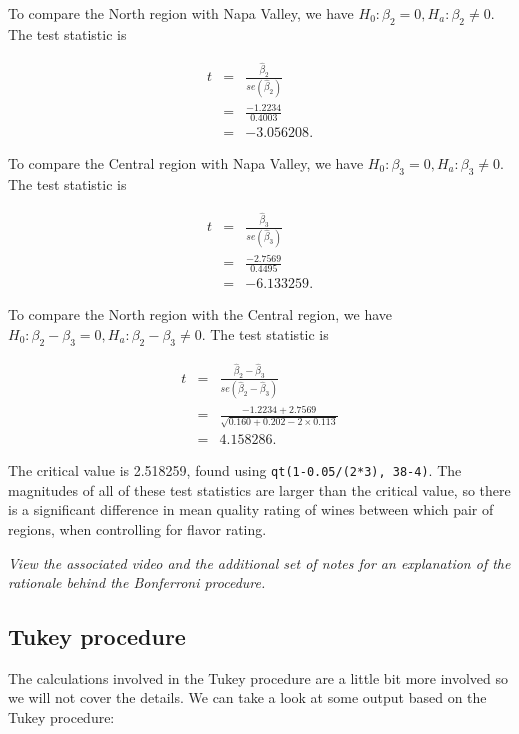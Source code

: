 \documentclass[
]{book}
\begin{document}
To compare the North region with Napa Valley, we have \(H_0: \beta_2 = 0, H_a: \beta_2 \neq 0\). The test statistic is

\begin{eqnarray*}
t &=& \frac{\hat{\beta}_2}{se(\hat{\beta}_2)} \nonumber \\
  &=& \frac{-1.2234}{0.4003} \nonumber \\
  &=& -3.056208.
\end{eqnarray*}

To compare the Central region with Napa Valley, we have \(H_0: \beta_3 = 0, H_a: \beta_3 \neq 0\). The test statistic is

\begin{eqnarray*}
t &=& \frac{\hat{\beta}_3}{se(\hat{\beta}_3)} \nonumber \\
  &=& \frac{-2.7569}{0.4495} \nonumber \\
  &=& -6.133259.
\end{eqnarray*}

To compare the North region with the Central region, we have \(H_0: \beta_2 - \beta_3 = 0, H_a: \beta_2 - \beta_3 \neq 0\). The test statistic is

\begin{eqnarray*}
t &=& \frac{\hat{\beta}_2 - \hat{\beta}_3}{se(\hat{\beta}_2 - \hat{\beta}_3)} \nonumber \\
  &=& \frac{-1.2234 + 2.7569}{\sqrt{0.160 + 0.202 - 2 \times 0.113}} \nonumber \\
  &=& 4.158286.
\end{eqnarray*}

The critical value is 2.518259, found using \texttt{qt(1-0.05/(2*3),\ 38-4)}. The magnitudes of all of these test statistics are larger than the critical value, so there is a significant difference in mean quality rating of wines between which pair of regions, when controlling for flavor rating.

\emph{View the associated video and the additional set of notes for an explanation of the rationale behind the Bonferroni procedure.}

\hypertarget{tukey-procedure}{%
\subsection{Tukey procedure}\label{tukey-procedure}}

The calculations involved in the Tukey procedure are a little bit more involved so we will not cover the details. We can take a look at some output based on the Tukey procedure:
\end{document}
